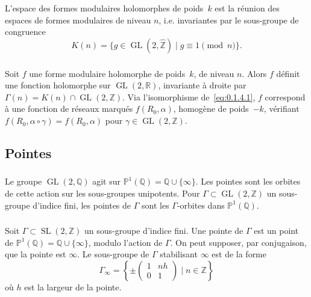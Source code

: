 \documentclass[11pt,a4paper]{amsart}
\theoremstyle{plain}
\theoremstyle{definition}
\theoremstyle{remark}
\DeclareMathOperator{\GL}{GL}
\DeclareMathOperator{\SL}{SL}
\newcommand{\ZZ}{\mathbb{Z}}
\newcommand{\QQ}{\mathbb{Q}}
\newcommand{\RR}{\mathbb{R}}
\newcommand{\wh}{\widehat}
\begin{document}
L'espace des formes modulaires holomorphes de poids~$k$ est la r\'eunion des espaces de formes modulaires de niveau $n$, i.e. invariantes par le sous-groupe de congruence
\[ K(n) = \{g \in \GL(2,\wh{\ZZ}) \mid g \equiv 1 \pmod{n}\}. \]

\subsubsection{}
\label{sec:1.2.5}

Soit $f$ une forme modulaire holomorphe de poids~$k$, de niveau $n$. Alors $f$ d\'efinit une fonction holomorphe sur $\GL(2,\RR)$, invariante \`a droite par $\Gamma(n) = K(n) \cap \GL(2,\ZZ)$. Via l'isomorphisme de~\eqref{eq:0.1.4.1}, $f$ correspond \`a une fonction de r\'eseaux marqu\'es $f(R_0, \alpha)$, homog\`ene de poids~$-k$, v\'erifiant $f(R_0, \alpha \circ \gamma) = f(R_0, \alpha)$ pour $\gamma \in \GL(2,\ZZ)$.

\subsection{Pointes}

\subsubsection{}
\label{sec:1.3.1}

Le groupe $\GL(2,\QQ)$ agit sur $\mathbb{P}^1(\QQ) = \QQ \cup \{\infty\}$. Les pointes sont les orbites de cette action sur les sous-groupes unipotents. Pour $\Gamma \subset \GL(2,\ZZ)$ un sous-groupe d'indice fini, les pointes de $\Gamma$ sont les $\Gamma$-orbites dans $\mathbb{P}^1(\QQ)$.

\subsubsection{}
\label{sec:1.3.2}

Soit $\Gamma \subset \SL(2,\ZZ)$ un sous-groupe d'indice fini. Une pointe de $\Gamma$ est un point de $\mathbb{P}^1(\QQ) = \QQ \cup \{\infty\}$, modulo l'action de $\Gamma$. On peut supposer, par conjugaison, que la pointe est $\infty$. Le sous-groupe de $\Gamma$ stabilisant $\infty$ est de la forme
\[ \Gamma_\infty = \left\{ \pm \begin{pmatrix} 1 & n h \\ 0 & 1 \end{pmatrix} \mid n \in \ZZ \right\} \]
o\`u $h$ est la largeur de la pointe.
\end{document}
